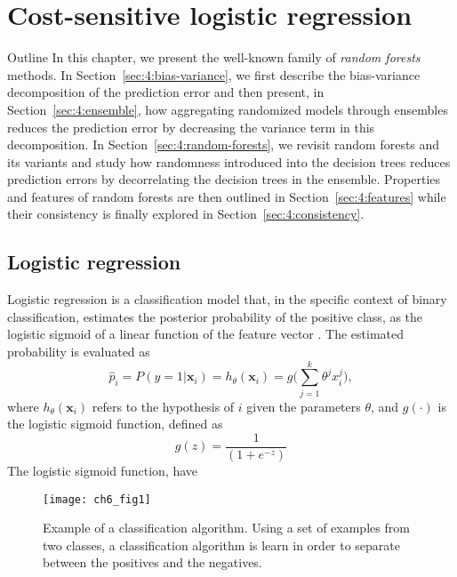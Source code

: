 \chapter{Cost-sensitive logistic regression}

\begin{remark}{Outline}
In this chapter, we present the well-known family of \textit{random forests}
methods. In Section~\ref{sec:4:bias-variance}, we first describe the bias-variance
decomposition of the prediction error and then present, in
Section~\ref{sec:4:ensemble}, how aggregating randomized models through
ensembles reduces the prediction error by decreasing the variance term in this
decomposition. In Section~\ref{sec:4:random-forests}, we revisit random forests
and its variants and study how randomness introduced into the decision trees
reduces prediction errors by decorrelating the decision
trees in the ensemble. Properties and features of random forests are then outlined
in Section~\ref{sec:4:features} while their consistency
is finally explored in Section~\ref{sec:4:consistency}.
\end{remark}

\section{Logistic regression}

Logistic regression is a classification model that, in the specific context of binary 
classification, estimates the posterior probability of the positive class, as the logistic sigmoid 
of a linear function of the feature vector \citep{Bishop2006}. The estimated probability  is 
evaluated as 
\begin{equation}
  \hat p_i = P(y=1 \vert \mathbf{x}_i) = h_{\theta}(\mathbf{x}_i) = 
  g\bigg(\sum_{j=1}^{k}{\theta^jx_i^j}\bigg),
\end{equation}
where $h_\theta(\mathbf{x}_i)$ refers to the hypothesis of $i$ given the parameters $\theta$,  
and  $g(\cdot)$ is the logistic sigmoid function, defined as
\begin{equation}
  g(z)=\frac{1}{(1+e^{-z})} 
\end{equation}
The logistic sigmoid function, have
\begin{figure}[htbp]
  \centering
  \texttt{[image: ch6\_fig1]}
  \caption{Example of a classification algorithm. Using a set of examples from two classes, a 
  classification algorithm is learn in order to separate between the positives and the negatives. }
  \label{fig:ch6:1}
\end{figure}


